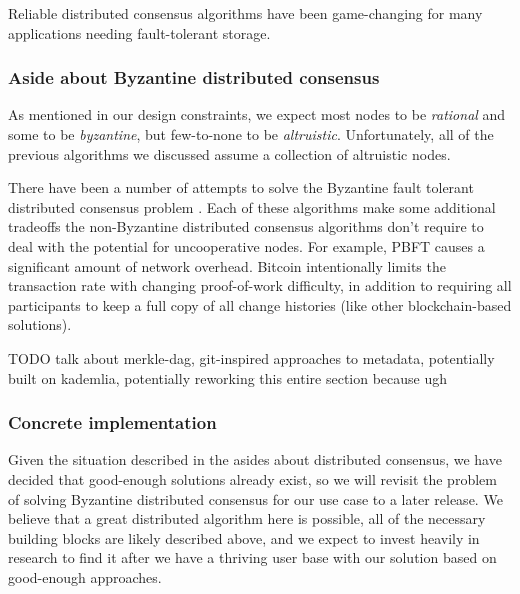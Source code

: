 \documentclass[a4paper,10pt]{article} \usepackage[utf8]{inputenc}
\newcommand{\todo}[1]{{\color{red} TODO #1 }}
\begin{document}
Reliable distributed consensus algorithms have been game-changing for many
applications needing fault-tolerant storage.

\subsubsection{Aside about Byzantine distributed consensus}

As mentioned in our design constraints, we expect most nodes to be {\em
rational} and some to be {\em byzantine}, but few-to-none to be {\em
altruistic}. Unfortunately, all of the previous algorithms we discussed assume a
collection of altruistic nodes.

There have been a number of attempts to solve the Byzantine fault tolerant
distributed consensus problem
\cite{bitcoin,pbft,qu,fab,fab-revisited,zyzzyva,rbft,
tangaroa,tendermint,aliph,hashgraph,honeybadger,algorand,casper,
tangle,avalanche,parsec,mickens-bft}. Each of these algorithms make some
additional tradeoffs the non-Byzantine distributed consensus algorithms don't
require to deal with the potential for uncooperative nodes. For example,
PBFT \cite{pbft} causes a significant amount of network overhead. Bitcoin
\cite{bitcoin} intentionally limits the transaction rate with changing
proof-of-work difficulty, in addition to requiring all participants to keep a
full copy of all change histories (like other blockchain-based
solutions).



\todo{talk about merkle-dag, git-inspired approaches to metadata, potentially
built on kademlia, potentially reworking this entire section because ugh}

\subsubsection{Concrete implementation}

Given the situation described in the asides about distributed consensus, we have
decided that good-enough solutions already exist, so we will revisit the
problem of solving Byzantine distributed consensus for our use
case to a later release. We believe that a great distributed algorithm here is
possible, all of the necessary building blocks are likely described above, and
we expect to invest heavily in research to find it after we have a thriving user
base with our solution based on good-enough approaches.
\end{document}
